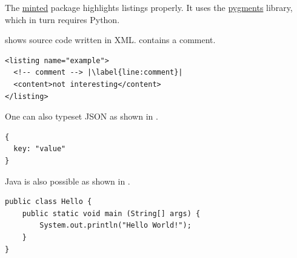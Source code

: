 The \href{https://github.com/gpoore/minted}{minted} package highlights listings properly.
It uses the \href{http://pygments.org/}{pygments} library, which in turn requires Python.

\begin{ltgexample}
 shows source code written in XML\@.
 contains a comment.

\begin{listing}[htbp]
  \begin{verbatim}
<listing name="example">
  <!-- comment --> |\label{line:comment}|
  <content>not interesting</content>
</listing>
\end{verbatim}
  \caption{Example XML listing using minted}
  \label{lst:XML}
\end{listing}
\end{ltgexample}

One can also typeset JSON as shown in .

\begin{ltgexample}
\begin{listing}[htbp]
  \begin{verbatim}
{
  key: "value"
}
\end{verbatim}
  \caption{Example JSON listing using minted}
  \label{lst:flJSON}
\end{listing}
\end{ltgexample}

Java is also possible as shown in .

\begin{ltgexample}
\begin{listing}[htbp]
  \begin{verbatim}
public class Hello {
    public static void main (String[] args) {
        System.out.println("Hello World!");
    }
}
\end{verbatim}
  \caption{Java code rendered using minted}
  \label{lst:flJava}
\end{listing}
\end{ltgexample}

